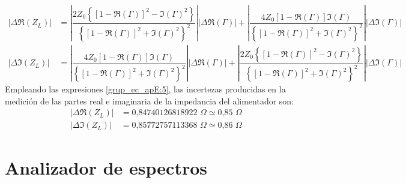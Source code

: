 \begin{subequations}
\label{grup_ec_apE:5}
\begin{align}
\left|\Delta\Re\!\left(Z_L\right)\right| &= \left|\dfrac{2Z_0\left\{\!\left[1 - \Re\!\left(\Gamma\right)\right]^2 - \Im\!\left(\Gamma\right)^2\right\}}{\left\{\!\left[1 - \Re\!\left(\Gamma\right)\right]^2 + \Im\!\left(\Gamma\right)^2\right\}^2}\right|\left|\Delta\Re\!\left(\Gamma\right)\right| + \left|\dfrac{4Z_0\left[1 - \Re\!\left(\Gamma\right)\right]\Im\!\left(\Gamma\right)}{\left\{\!\left[1 - \Re\!\left(\Gamma\right)\right]^2 + \Im\!\left(\Gamma\right)^2\right\}^2}\right|\left|\Delta\Im\!\left(\Gamma\right)\right|
\label{ec_apE:12}\\
\left|\Delta\Im\!\left(Z_L\right)\right| &= \left|\dfrac{4Z_0\left[1 - \Re\!\left(\Gamma\right)\right]\Im\!\left(\Gamma\right)}{\left\{\!\left[1 - \Re\!\left(\Gamma\right)\right]^2 + \Im\!\left(\Gamma\right)^2\right\}^2}\right|\left|\Delta\Re\!\left(\Gamma\right)\right| + \left|\dfrac{2Z_0\left\{\!\left[1 - \Re\!\left(\Gamma\right)\right]^2 - \Im\!\left(\Gamma\right)^2\right\}}{\left\{\!\left[1 - \Re\!\left(\Gamma\right)\right]^2 + \Im\!\left(\Gamma\right)^2\right\}^2}\right|\left|\Delta\Im\!\left(\Gamma\right)\right|
\label{ec_apE:13}
\end{align}
\end{subequations}
Empleando las expresiones \eqref{grup_ec_apE:5}, las incertezas producidas en la medición de las partes real e imaginaria de la impedancia del alimentador son:
\begin{align*}
\left|\Delta\Re\!\left(Z_L\right)\right| &= \text{0,84740126818922 }\Omega \simeq \text{0,85 }\Omega\\
\left|\Delta\Im\!\left(Z_L\right)\right| &= \text{0,85772757113368 }\Omega \simeq \text{0,86 }\Omega
\end{align*}

\section{Analizador de espectros}

